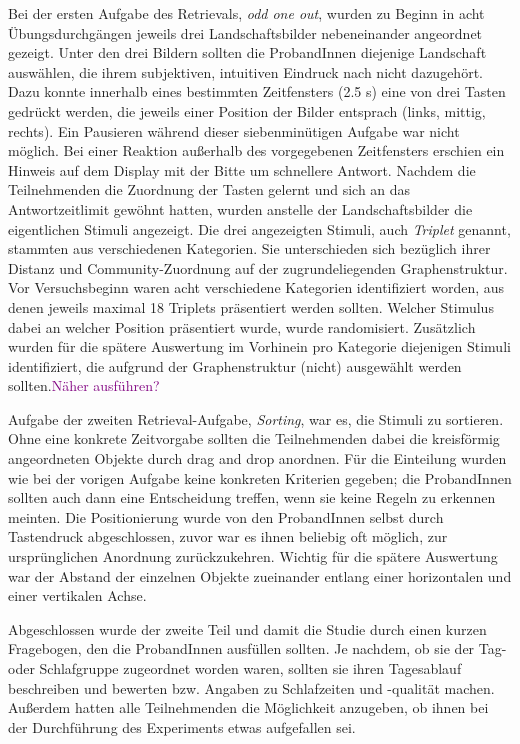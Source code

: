Bei der ersten Aufgabe des Retrievals, \textit{odd one out}, wurden zu Beginn in acht Übungsdurchgängen jeweils drei Landschaftsbilder nebeneinander angeordnet gezeigt. Unter den drei Bildern sollten die ProbandInnen diejenige Landschaft auswählen, die ihrem subjektiven, intuitiven Eindruck nach nicht dazugehört. Dazu konnte innerhalb eines bestimmten Zeitfensters (2.5 s) eine von drei Tasten gedrückt werden, die jeweils einer Position der Bilder entsprach (links, mittig, rechts). Ein Pausieren während dieser siebenminütigen Aufgabe war nicht möglich. Bei einer Reaktion außerhalb des vorgegebenen Zeitfensters erschien ein Hinweis auf dem Display mit der Bitte um schnellere Antwort. Nachdem die Teilnehmenden die Zuordnung der Tasten gelernt und sich an das Antwortzeitlimit gewöhnt hatten, wurden anstelle der Landschaftsbilder die eigentlichen Stimuli angezeigt. Die drei angezeigten Stimuli, auch \textit{Triplet} genannt, stammten aus verschiedenen Kategorien. Sie unterschieden sich bezüglich ihrer Distanz und Community-Zuordnung auf der zugrundeliegenden Graphenstruktur. Vor Versuchsbeginn waren acht verschiedene Kategorien identifiziert worden, aus denen jeweils maximal 18 Triplets präsentiert werden sollten. Welcher Stimulus dabei an welcher Position präsentiert wurde, wurde randomisiert. Zusätzlich wurden für die spätere Auswertung im Vorhinein pro Kategorie diejenigen Stimuli identifiziert, die aufgrund der Graphenstruktur (nicht) ausgewählt werden sollten.\textcolor{purple}{Näher ausführen?}

Aufgabe der zweiten Retrieval-Aufgabe, \textit{Sorting}, war es, die Stimuli zu sortieren. Ohne eine konkrete Zeitvorgabe sollten die Teilnehmenden dabei die kreisförmig angeordneten Objekte durch drag and drop anordnen. Für die Einteilung wurden wie bei der vorigen Aufgabe keine konkreten Kriterien gegeben; die ProbandInnen sollten auch dann eine Entscheidung treffen, wenn sie keine Regeln zu erkennen meinten. Die Positionierung wurde von den ProbandInnen selbst durch Tastendruck abgeschlossen, zuvor war es ihnen beliebig oft möglich, zur ursprünglichen Anordnung zurückzukehren. Wichtig für die spätere Auswertung war der Abstand der einzelnen Objekte zueinander entlang einer horizontalen und einer vertikalen Achse.

Abgeschlossen wurde der zweite Teil und damit die Studie durch einen kurzen Fragebogen, den die ProbandInnen ausfüllen sollten. Je nachdem, ob sie der Tag- oder Schlafgruppe zugeordnet worden waren, sollten sie ihren Tagesablauf beschreiben und bewerten bzw. Angaben zu Schlafzeiten und -qualität machen. Außerdem hatten alle Teilnehmenden die Möglichkeit anzugeben, ob ihnen bei der Durchführung des Experiments etwas aufgefallen sei.

